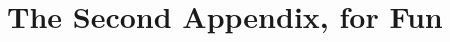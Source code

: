 \documentclass[12pt,twoside]{reedthesis}
\begin{document}
      \chapter{The Second Appendix, for Fun}



  \backmatter %

    \nocite{*}


%  
 

\end{document}
